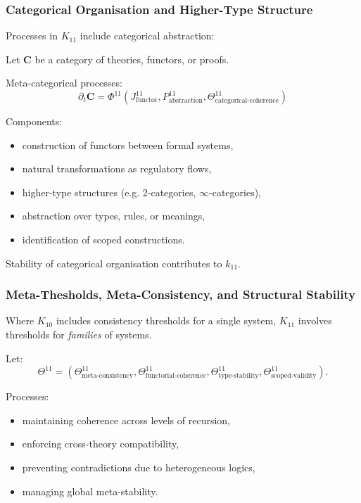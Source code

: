 \subsubsection{Categorical Organisation and Higher-Type Structure}

Processes in $K_{11}$ include categorical abstraction:

Let $\mathbf{C}$ be a category of theories, functors, or proofs.

Meta-categorical processes:
\[
\partial_t \mathbf{C} =
\Phi^{11}(J^{11}_{\text{functor}},
          P^{11}_{\text{abstraction}},
          \Theta^{11}_{\text{categorical-coherence}})
\]

Components:
\begin{itemize}
    \item construction of functors between formal systems,
    \item natural transformations as regulatory flows,
    \item higher-type structures (e.g. 2-categories, $\infty$-categories),
    \item abstraction over types, rules, or meanings,
    \item identification of scoped constructions.
\end{itemize}

Stability of categorical organisation contributes to $k_{11}$.

\subsubsection{Meta-Thesholds, Meta-Consistency, and Structural Stability}

Where $K_{10}$ includes consistency thresholds for a single system,
$K_{11}$ involves thresholds for \emph{families} of systems.

Let:
\[
\Theta^{11} =
(\Theta^{11}_{\text{meta-consistency}},
 \Theta^{11}_{\text{functorial-coherence}},
 \Theta^{11}_{\text{type-stability}},
 \Theta^{11}_{\text{scoped-validity}}).
\]

Processes:
\begin{itemize}
    \item maintaining coherence across levels of recursion,
    \item enforcing cross-theory compatibility,
    \item preventing contradictions due to heterogeneous logics,
    \item managing global meta-stability.
\end{itemize}

